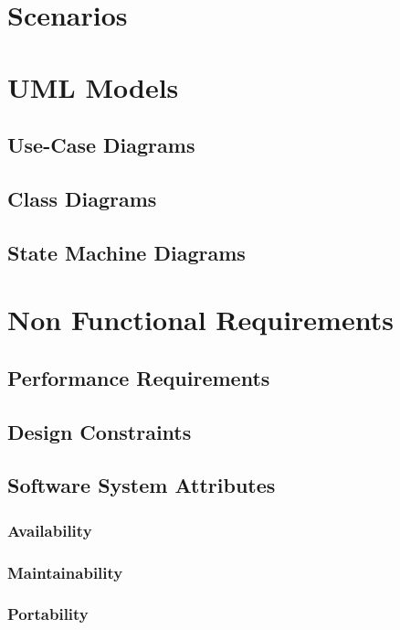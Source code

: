 \documentclass{report}
\begin{document}
	\section{Scenarios}


	\section{UML Models}

		\subsection{Use-Case Diagrams}

		\subsection{Class Diagrams}

		\subsection{State Machine Diagrams}

	\section{Non Functional Requirements}

		\subsection{Performance Requirements}

		\subsection{Design Constraints}

		\subsection{Software System Attributes}

			\subsubsection{Availability}

			\subsubsection{Maintainability}

			\subsubsection{Portability}
\end{document}
